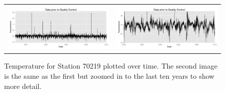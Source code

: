 \documentclass[12pt]{article}
\begin{document}

\clearpage
\begin{figure}[h!]
	\centering
	\begin{tabular}{cc}
		\includegraphics[width=.5\textwidth]{70219_Data_Unhomogenized_no_vlines} &
		\includegraphics[width=.5\textwidth]{70219_Data_Unhomogenized_zoomed_no_vlines}
	\end{tabular}
	\caption{Temperature for Station 70219 plotted over time.  The second image is the same as the first but zoomed in to the last ten years to show more detail.}
	\label{fig:BasicTS}
\end{figure}
\end{document}
